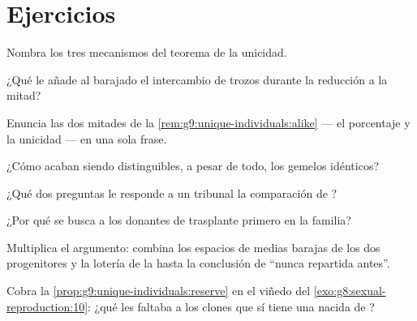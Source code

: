 \section{Ejercicios}

\begin{exercise}[$\star$]\label{exo:g9:unique-individuals:1}
Nombra los tres mecanismos del teorema de la unicidad.
\end{exercise}

\begin{exercise}[$\star$]\label{exo:g9:unique-individuals:2}
¿Qué le añade al barajado el intercambio de trozos durante la reducción
a la mitad?
\end{exercise}

\begin{exercise}[$\star$]\label{exo:g9:unique-individuals:3}
Enuncia las dos mitades de la \cref{rem:g9:unique-individuals:alike}
--- el porcentaje y la unicidad --- en una sola frase.
\end{exercise}

\begin{exercise}[$\star$]\label{exo:g9:unique-individuals:4}
¿Cómo acaban siendo distinguibles, a pesar de todo, los gemelos idénticos?
\end{exercise}

\begin{exercise}[$\star$]\label{exo:g9:unique-individuals:5}
¿Qué dos preguntas le responde a un tribunal la comparación de ?
\end{exercise}

\begin{exercise}[$\star$]\label{exo:g9:unique-individuals:6}
¿Por qué se busca a los donantes de trasplante primero en la familia?
\end{exercise}

\begin{exercise}[$\star\star$]\label{exo:g9:unique-individuals:7}
Multiplica el argumento: combina los espacios de medias barajas de los
dos progenitores y la lotería de la  hasta la conclusión de
``nunca repartida antes''.
\end{exercise}

\begin{exercise}[$\star\star$]\label{exo:g9:unique-individuals:8}
Cobra la \cref{prop:g9:unique-individuals:reserve} en el viñedo del
\cref{exo:g8:sexual-reproduction:10}: ¿qué les faltaba a los clones que
sí tiene una  nacida de ?
\end{exercise}

